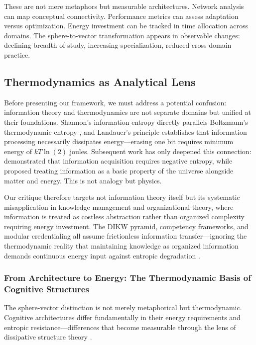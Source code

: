 These are not mere metaphors but measurable architectures. Network analysis can map conceptual connectivity. Performance metrics can assess adaptation versus optimization. Energy investment can be tracked in time allocation across domains. The sphere-to-vector transformation appears in observable changes: declining breadth of study, increasing specialization, reduced cross-domain practice.

\subsection{Thermodynamics as Analytical Lens}

Before presenting our framework, we must address a potential confusion: information theory and thermodynamics are not separate domains but unified at their foundations. Shannon's information entropy directly parallels Boltzmann's thermodynamic entropy \citep{shannon1948}, and Landauer's principle \citep{landauer1961} establishes that information processing necessarily dissipates energy—erasing one bit requires minimum energy of $kT \ln(2)$ joules. Subsequent work has only deepened this connection: \citet{brillouin1956} demonstrated that information acquisition requires negative entropy, while \citet{stonier1996} proposed treating information as a basic property of the universe alongside matter and energy. This is not analogy but physics.

Our critique therefore targets not information theory itself but its systematic misapplication in knowledge management and organizational theory, where information is treated as costless abstraction rather than organized complexity requiring energy investment. The DIKW pyramid, competency frameworks, and modular credentialing all assume frictionless information transfer—ignoring the thermodynamic reality that maintaining knowledge as organized information demands continuous energy input against entropic degradation \citep{schrodinger1944}.

\subsubsection{From Architecture to Energy: The Thermodynamic Basis of Cognitive Structures}

The sphere-vector distinction is not merely metaphorical but thermodynamic. Cognitive architectures differ fundamentally in their energy requirements and entropic resistance—differences that become measurable through the lens of dissipative structure theory \citep{prigogine1984order}.


